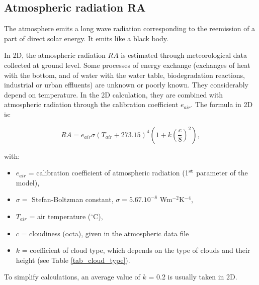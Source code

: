 \subsection{Atmospheric radiation RA}

The atmosphere emits a long wave radiation corresponding to the reemission of a
part of direct solar energy. It emits like a black body.

In 2D, the atmospheric radiation $RA$ is estimated through meteorological data collected at ground level.
Some processes of energy exchange (exchanges of heat with the bottom,
and of water with the water table, biodegradation reactions,
industrial or urban effluents) are unknown or poorly known.
They considerably depend on temperature.
In the 2D calculation, they are combined with atmospheric radiation
through the calibration coefficient $e_{air}$. The formula in 2D is:

\begin{equation}
  RA = e_{air} \sigma (T_{air} + 273.15 )^4 \left( 1+k\left( \frac{c}{8} \right) ^2 \right),
\end{equation}

with:
\begin{itemize}
  \item $e_{air}$ = calibration coefficient of atmospheric radiation (1$^{\rm{st}}$ parameter of the model),
  \item $\sigma = $ Stefan-Boltzman constant, $\sigma = 5.67.10^{-8}$ Wm$^{-2}$K$^{-4}$,
  \item $T_{air}$ = air temperature ($^{\circ}$C),
  \item $c$ = cloudiness (octa), given in the atmospheric data file
  \item $k$ = coefficient of cloud type, which depends on the type of clouds and their height
    (see Table \ref{tab_cloud_type}).
\end{itemize}
To simplify calculations, an average value of $k$ = 0.2 is usually taken in 2D.\\

